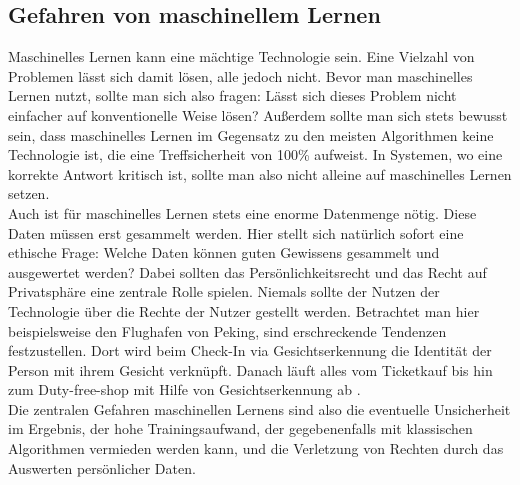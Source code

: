 \documentclass[11pt]{article}
\begin{document}
\subsection{Gefahren von maschinellem Lernen}
Maschinelles Lernen kann eine mächtige Technologie sein. Eine Vielzahl von Problemen lässt sich damit lösen, alle jedoch nicht. Bevor man maschinelles Lernen nutzt, sollte man sich also fragen: Lässt sich dieses Problem nicht einfacher auf konventionelle Weise lösen? Außerdem sollte man sich stets bewusst sein, dass maschinelles Lernen im Gegensatz zu den meisten Algorithmen keine Technologie ist, die eine Treffsicherheit von 100\% aufweist. In Systemen, wo eine korrekte Antwort kritisch ist, sollte man also nicht alleine auf maschinelles Lernen setzen.\\
Auch ist für maschinelles Lernen stets eine enorme Datenmenge nötig. Diese Daten müssen erst gesammelt werden. Hier stellt sich natürlich sofort eine ethische Frage: Welche Daten können guten Gewissens gesammelt und ausgewertet werden? Dabei sollten das Persönlichkeitsrecht und das Recht auf Privatsphäre eine zentrale Rolle spielen. Niemals sollte der Nutzen der Technologie über die Rechte der Nutzer gestellt werden. Betrachtet man hier beispielsweise den Flughafen von Peking, sind erschreckende Tendenzen festzustellen. Dort wird beim Check-In via Gesichtserkennung die Identität der Person mit ihrem Gesicht verknüpft. Danach läuft alles vom Ticketkauf bis hin zum Duty-free-shop mit Hilfe von Gesichtserkennung ab \cite{4}.\\
Die zentralen Gefahren maschinellen Lernens sind also die eventuelle Unsicherheit im Ergebnis, der hohe Trainingsaufwand, der gegebenenfalls mit klassischen Algorithmen vermieden werden kann, und die Verletzung von Rechten durch das Auswerten persönlicher Daten.
\end{document}

